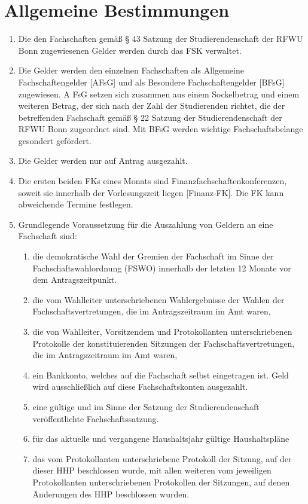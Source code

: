 \documentclass{article}
\begin{document}
\section{Allgemeine Bestimmungen}
\begin{enumerate}[(1)]
    \item Die den Fachschaften gemäß § 43 Satzung der Studierendenschaft der RFWU Bonn zugewiesenen Gelder werden durch das FSK verwaltet.
    \item Die Gelder werden den einzelnen Fachschaften als Allgemeine Fachschaftengelder [AFsG] und als Besondere Fachschaftengelder [BFsG] zugewiesen. A
    	FsG setzen sich zusammen aus einem Sockelbetrag und einem weiteren Betrag, der sich nach der Zahl der Studierenden richtet, die der betreffenden Fachschaft gemäß § 22 Satzung der Studierendenschaft der RFWU Bonn zugeordnet sind. 
    	Mit BFsG werden wichtige Fachschaftsbelange gesondert gefördert.
    \item Die Gelder werden nur auf Antrag ausgezahlt.
    \item Die ersten beiden FKs eines Monats sind Finanzfachschaftenkonferenzen, soweit sie innerhalb der Vorlesungszeit liegen [Finanz-FK]. 
    	Die FK kann abweichende Termine festlegen.
    \item Grundlegende Voraussetzung für die Auszahlung von Geldern an eine Fachschaft sind:
    \begin{enumerate}[1.]
        \item die demokratische Wahl der Gremien der Fachschaft im Sinne der Fachschaftswahlordnung (FSWO) innerhalb der letzten 12 Monate vor dem Antragszeitpunkt.
        \item die vom Wahlleiter unterschriebenen Wahlergebnisse der Wahlen der Fachschaftsvertretungen, die im Antragszeitraum im Amt waren,
        \item die von Wahlleiter, Vorsitzendem und Protokollanten unterschriebenen Protokolle der konstituierenden Sitzungen der Fachschaftsvertretungen, die im Antragszeitraum im Amt waren,
        \item ein Bankkonto, welches auf die Fachschaft selbst eingetragen ist. 
        	Geld wird ausschließlich auf diese Fachschaftskonten ausgezahlt.
        \item eine gültige und im Sinne der Satzung der Studierendenschaft veröffentlichte Fachschaftssatzung. 
        \item für das aktuelle und vergangene Haushaltsjahr gültige Haushaltspläne
        \item das vom Protokollanten unterschriebene Protokoll der Sitzung, auf der dieser HHP beschlossen wurde, mit allen weiteren vom jeweiligen Protokollanten unterschriebenen Protokollen der Sitzungen, auf denen Änderungen des HHP beschlossen wurden.

\end{enumerate}
\end{enumerate}
\end{document}
